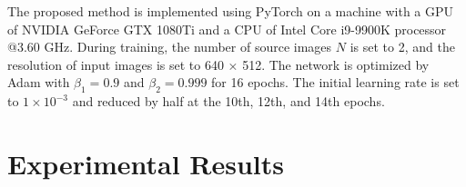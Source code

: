 \documentclass[10pt,twocolumn,letterpaper]{article}
\begin{document}
The proposed method is implemented using PyTorch on a machine with a GPU of NVIDIA GeForce GTX 1080Ti and a CPU of Intel Core i9-9900K processor @3.60 GHz. During training, the number of source images $N$ is set to 2, and the resolution of input images is set to 640 × 512. The network is optimized by Adam with $\beta_{1}=0.9$ and $\beta_{2}=0.999$ for 16 epochs. The initial learning rate is set to $1 \times 10^{-3}$ and reduced by half at the 10th, 12th, and 14th epochs.

\section{Experimental Results}

\end{document}
